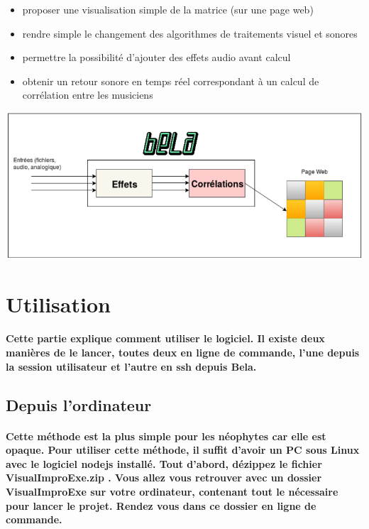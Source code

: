 \documentclass[a4paper]{article}
\begin{document}
\begin{itemize} \item proposer une visualisation simple de la matrice (sur une
page web) \item rendre simple le changement des algorithmes de traitements
visuel et sonores \item permettre la possibilité d’ajouter des effets audio
avant calcul \item obtenir un retour sonore en temps réel correspondant à un
calcul de corrélation entre les musiciens \end{itemize}

\includegraphics[width=1\textwidth]{Bela1.png}

\section{Utilisation} \paragraph{Cette partie explique comment utiliser le
logiciel. Il existe deux manières de le lancer, toutes deux en ligne de
commande, l’une depuis la session utilisateur et l’autre en ssh depuis Bela.}

\subsection{Depuis l'ordinateur} \paragraph{Cette méthode est la plus simple
pour les néophytes car elle est opaque. Pour utiliser cette méthode, il suffit
d’avoir un PC sous Linux avec le logiciel nodejs installé. Tout d’abord,
dézippez le fichier VisualImproExe.zip . Vous allez vous retrouver avec un
dossier VisualImproExe sur votre ordinateur, contenant tout le nécessaire pour
lancer le projet. Rendez vous dans ce dossier en ligne de
commande.\newline\newline}
\end{document}
